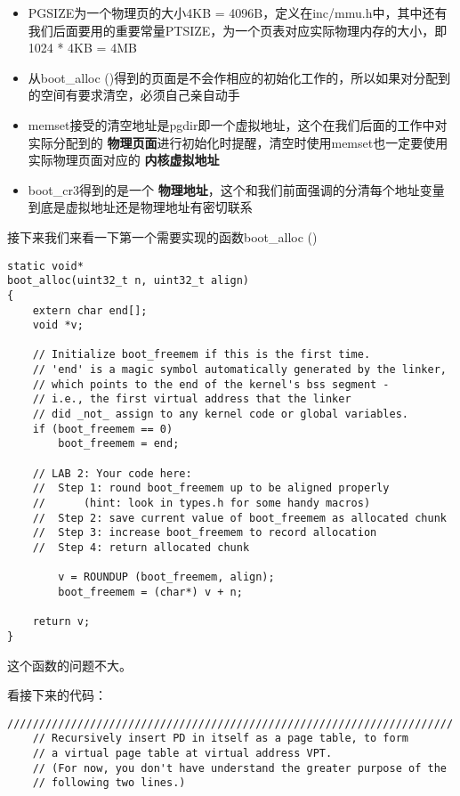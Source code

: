 \documentclass{article}
\newcommand{\highlight}[1]{{\bfseries \color{red}  #1}}
\newcommand{\funcname}[1]{{\ttfamily \small #1}}
\begin{document}
\begin{CJK*}{UTF8}{gkai}
\begin{itemize}
\item{PGSIZE为一个物理页的大小4KB = 4096B，定义在inc/mmu.h中，其中还有我们后面要用的重要常量PTSIZE，为一个页表对应实际物理内存的大小，即1024 * 4KB = 4MB}
\item{从\funcname{boot\_alloc ()}得到的页面是不会作相应的初始化工作的，所以如果对分配到的空间有要求清空，必须自己亲自动手}
\item{\funcname{memset}接受的清空地址是pgdir即一个虚拟地址，这个在我们后面的工作中对实际分配到的\highlight{物理页面}进行初始化时提醒，清空时使用\funcname{memset}也一定要使用实际物理页面对应的\highlight{内核虚拟地址}}
\item{boot\_cr3得到的是一个\highlight{物理地址}，这个和我们前面强调的分清每个地址变量到底是虚拟地址还是物理地址有密切联系}
\end{itemize}

接下来我们来看一下第一个需要实现的函数\funcname{boot\_alloc ()}

\begin{lstlisting}[style=ccode, title={\scriptsize \ttfamily \bfseries kern/pmap.c: boot\_alloc ()}]
static void*
boot_alloc(uint32_t n, uint32_t align)
{
	extern char end[];
	void *v;

	// Initialize boot_freemem if this is the first time.
	// 'end' is a magic symbol automatically generated by the linker,
	// which points to the end of the kernel's bss segment -
	// i.e., the first virtual address that the linker
	// did _not_ assign to any kernel code or global variables.
	if (boot_freemem == 0)
		boot_freemem = end;

	// LAB 2: Your code here:
	//	Step 1: round boot_freemem up to be aligned properly
	//		(hint: look in types.h for some handy macros)
	//	Step 2: save current value of boot_freemem as allocated chunk
	//	Step 3: increase boot_freemem to record allocation
	//	Step 4: return allocated chunk

    	v = ROUNDUP (boot_freemem, align);
    	boot_freemem = (char*) v + n;
    
	return v;
}
\end{lstlisting}

这个函数的问题不大。

看接下来的代码：\label{vpt}

\begin{lstlisting}[style=ccode, title={\scriptsize \ttfamily \bfseries kern/pmap.c: i386\_vm\_init ()}]
	//////////////////////////////////////////////////////////////////////
	// Recursively insert PD in itself as a page table, to form
	// a virtual page table at virtual address VPT.
	// (For now, you don't have understand the greater purpose of the
	// following two lines.)


\end{lstlisting}
\end{CJK*}
\end{document}
